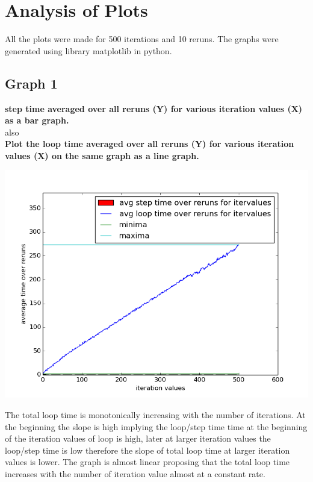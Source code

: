 \documentclass[11pt]{article}
\begin{document}
\section{Analysis of Plots}
All the plots were made for 500 iterations and 10 reruns. The graphs were generated using library matplotlib\cite{matplot} in python.


\subsection{Graph 1}
\textbf{step time averaged over all reruns (Y) for various iteration values (X) as a bar graph.}\\
also\\
\textbf{Plot the loop time averaged over all reruns (Y) for various iteration values (X) on the same graph as a line graph.}
\begin{center}
		\includegraphics[scale=0.4]{g10_project_plot01}
\end{center}
The total loop time is monotonically increasing with the number of iterations. At the beginning the slope is high implying the loop/step time time at the beginning of the iteration values of loop is high, later at larger iteration values the loop/step time is low therefore the slope of total loop time at larger iteration values is lower. The graph is almost linear proposing that the total loop time increases with the number of iteration value almost at a constant rate.
\end{document}
